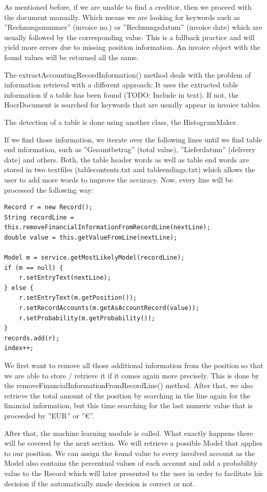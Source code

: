 As mentioned before, if we are unable to find a creditor, then we proceed with the document manually. Which means we are looking for keywords such as ''Rechnungsnummer'' (invoice no.) or ''Rechnungsdatum'' (invoice date) which are usually followed by the corresponding value. This is a fallback practice and will yield more errors due to missing position information. An invoice object with the found values will be returned all the same.

The extractAccountingRecordInformation() method deals with the problem of information retrieval with a different approach: It uses the extracted table information if a table has been found (TODO: Include in text). If not, the HocrDocument is searched for keywords that are usually appear in invoice tables.

The detection of a table is done using another class, the HistogramMaker. 

If we find those information, we iterate over the following lines until we find table end information, such as ''Gesamtbetrag'' (total value), ''Lieferdatum'' (delivery date) and others. Both, the table header words as well as table end words are stored in two textfiles (tablecontents.txt and tableendings.txt) which allows the user to add more words to improve the accuracy.
Now, every line will be processed the following way:

\begin{lstlisting}[caption={Extraction of accounting record information},label={arExtraction}]
Record r = new Record();
String recordLine = this.removeFinancialInformationFromRecordLine(nextLine);
double value = this.getValueFromLine(nextLine);

Model m = service.getMostLikelyModel(recordLine); 
if (m == null) {
    r.setEntryText(nextLine);
} else {
    r.setEntryText(m.getPosition());
    r.setRecordAccounts(m.getAsAccountRecord(value));
    r.setProbability(m.getProbability());
}
records.add(r);
index++;
\end{lstlisting}

We first want to remove all those additional information from the position so that we are able to store / retrieve it if it comes again more precisely. This is done by the removeFinancialInformationFromRecordLine() method. After that, we also retrieve the total amount of the position by searching in the line again for the financial information, but this time searching for the last numeric value that is proceeded by ''EUR'' or ''\euro''.

After that, the machine learning module is called. What exactly happens there will be covered by the next section. We will retrieve a possible Model that applies to our position. We can assign the found value to every involved account as the Model also contains the percentual values of each account and add a probability value to the Record which will later presented to the user in order to facilitate his decision if the automatically made decision is correct or not.


